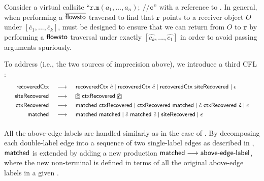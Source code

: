 Consider a virtual callsite 
``$\mathtt{r}.\mathtt{m}(a_1, \dots, a_n); ~ // \mathtt{c}$'' with a reference to
.
In general, when performing a $\overline{\textsf{flowsto}}$ traversal to find that 
$\mathtt{r}$ points to a receiver object $O$ under $[\check{c_1},...,\check{c_k}]$,
\LR must be designed to ensure that we can return from $O$ to $\mathtt{r}$  by performing a $\textsf{flowsto}$ traversal
under exactly $[\hat{c_k},...,\hat{c_1}]$ in order to avoid passing arguments spuriously.

To address  (i.e., the two sources of imprecision above), we  introduce  a third CFL \LR: 
\begin{equation}
\footnotesize
    \label{eqn:callsiteLR}
    \begin{tabular}{rcl}
$\recoveredctx$ & $\longrightarrow$ & $\recoveredctx~\hat{c} \mid \recoveredctx~\check{c} \mid \recoveredctx~ \siterecovered \mid \epsilon$\\[1ex]
$\siterecovered$ & $\longrightarrow$ & $\hat{\boxed{c}} ~ \ctxrecovered ~ \check{\boxed{c}}$\\[1ex]
$\ctxrecovered$ & $\longrightarrow$ & $\matched ~ \ctxrecovered \mid \ctxrecovered ~ \matched \mid\check{c} ~ \ctxrecovered ~ \hat{c} \mid \epsilon$\\[1ex]
$\matched$ & $\longrightarrow$ & $\matched ~ \matched \mid \hat{c} ~ \matched ~ \check{c} \mid \siterecovered\mid\epsilon$ \\[1ex]
    \end{tabular}
\end{equation}

All the above-edge labels are handled similarly as in the case of \manuLC. By
decomposing each double-label edge into a sequence of
two single-label edges as described in
, $\textsf{matched}$ is extended by adding
a new production 
$\textsf{matched} \longrightarrow  \textsf{above-edge-label}$, where
 the new non-terminal
  is defined in terms of all the original above-edge
labels  in a given \pag.


